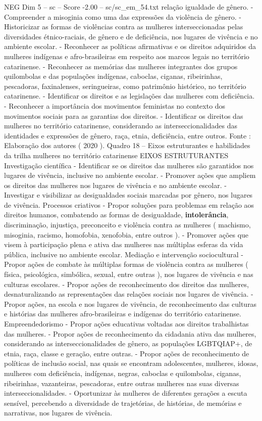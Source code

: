 \begin{textsample}{NEG Dim 5 – sc – Score -2.00 – sc/sc\_em\_54.txt}
relação igualdade de gênero. - Compreender a misoginia como uma das expressões da violência de gênero. - Historicizar as formas de violências contra as mulheres interseccionadas pelas diversidades étnico-raciais, de gênero e de deficiência, nos lugares de vivência e no ambiente escolar. - Reconhecer as políticas afirmativas e os direitos adquiridos da mulheres indígenas e afro-brasileiras em respeito aos marcos legais no território catarinense. - Reconhecer as memórias das mulheres integrantes dos grupos quilombolas e das populações indígenas, caboclas, ciganas, ribeirinhas, pescadoras, faxinalenses, seringueiras, como patrimônio histórico, no território catarinense. - Identificar os direitos e as legislações das mulheres com deficiência. - Reconhecer a importância dos movimentos feministas no contexto dos movimentos sociais para as garantias dos direitos. - Identificar os direitos das mulheres no território catarinense, considerando as interseccionalidades das identidades e expressões de gênero, raça, etnia, deficiência, entre outros.
Fonte : Elaboração dos autores ( 2020 ).
Quadro 18 – Eixos estruturantes e habilidades da trilha mulheres no território catarinense EIXOS ESTRUTURANTES Investigação científica - Identificar se os direitos das mulheres são garantidos nos lugares de vivência, inclusive no ambiente escolar. - Promover ações que ampliem os direitos das mulheres nos lugares de vivência e no ambiente escolar. - Investigar e visibilizar as desigualdades sociais marcadas por gênero, nos lugares de vivência.
Processos criativos - Propor soluções para problemas em relação aos direitos humanos, combatendo as formas de desigualdade, \textbf{intolerância}, discriminação, injustiça, preconceito e violência contra as mulheres ( machismo, misoginia, racismo, homofobia, xenofobia, entre outros ). - Promover ações que visem à participação plena e ativa das mulheres nas múltiplas esferas da vida pública, inclusive no ambiente escolar.
Mediação e intervenção sociocultural - Propor ações de combate às múltiplas formas de violência contra as mulheres ( física, psicológica, simbólica, sexual, entre outras ), nos lugares de vivência e nas culturas escolares. - Propor ações de reconhecimento dos direitos das mulheres, desnaturalizando as representações das relações sociais nos lugares de vivência. - Propor ações, na escola e nos lugares de vivência, de reconhecimento das culturas e histórias das mulheres afro-brasileiras e indígenas do território catarinense.
Empreendedorismo - Propor ações educativas voltadas aos direitos trabalhistas das mulheres. - Propor ações de reconhecimento da cidadania ativa das mulheres, considerando as interseccionalidades de gênero, as populações LGBTQIAP+, de etnia, raça, classe e geração, entre outras. - Propor ações de reconhecimento de políticas de inclusão social, nas quais se encontram adolescentes, mulheres, idosas, mulheres com deficiência, indígenas, negras, caboclas e quilombolas, ciganas, ribeirinhas, vazanteiras, pescadoras, entre outras mulheres nas suas diversas interseccionalidades. - Oportunizar às mulheres de diferentes gerações a escuta sensível, percebendo a diversidade de trajetórias, de histórias, de memórias e narrativas, nos lugares de vivência.

\end{textsample}
